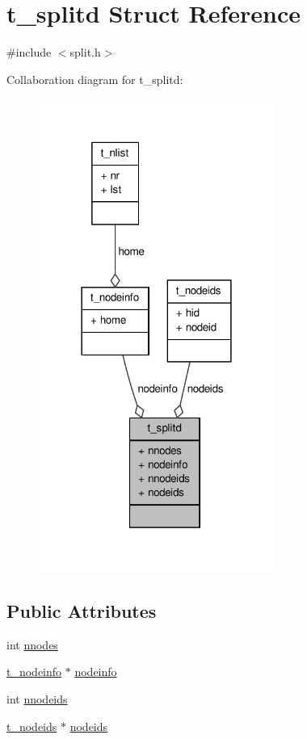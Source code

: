 \hypertarget{structt__splitd}{\section{t\-\_\-splitd \-Struct \-Reference}
\label{structt__splitd}
}


{\ttfamily \#include $<$split.\-h$>$}



\-Collaboration diagram for t\-\_\-splitd\-:
\nopagebreak
\begin{figure}[H]
\begin{center}
\leavevmode
\includegraphics[width=218pt]{structt__splitd__coll__graph}
\end{center}
\end{figure}
\subsection*{\-Public \-Attributes}
\begin{DoxyCompactItemize}
\item 
int \hyperlink{structt__splitd_a4b29e024e44b84c5b2315e71164f9a08}{nnodes}
\item 
\hyperlink{structt__nodeinfo}{t\-\_\-nodeinfo} $\ast$ \hyperlink{structt__splitd_a88368696d22668b538bc92b3275fb19c}{nodeinfo}
\item 
int \hyperlink{structt__splitd_a9c3e3b3c74175e6e9836185ee0eb5194}{nnodeids}
\item 
\hyperlink{structt__nodeids}{t\-\_\-nodeids} $\ast$ \hyperlink{structt__splitd_a6040e1fad00c2db7198f8f662fefc11f}{nodeids}
\end{DoxyCompactItemize}


